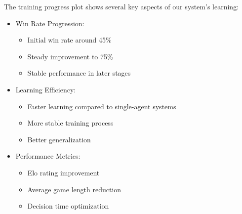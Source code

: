 \documentclass[conference]{IEEEtran}
\begin{document}
The training progress plot shows several key aspects of our system's learning:

\begin{itemize}
\item Win Rate Progression:
   \begin{itemize}
   \item Initial win rate around 45\%
   \item Steady improvement to 75\%
   \item Stable performance in later stages
   \end{itemize}

\item Learning Efficiency:
   \begin{itemize}
   \item Faster learning compared to single-agent systems
   \item More stable training process
   \item Better generalization
   \end{itemize}

\item Performance Metrics:
   \begin{itemize}
   \item Elo rating improvement
   \item Average game length reduction
   \item Decision time optimization
   \end{itemize}
\end{itemize}
\end{document}
